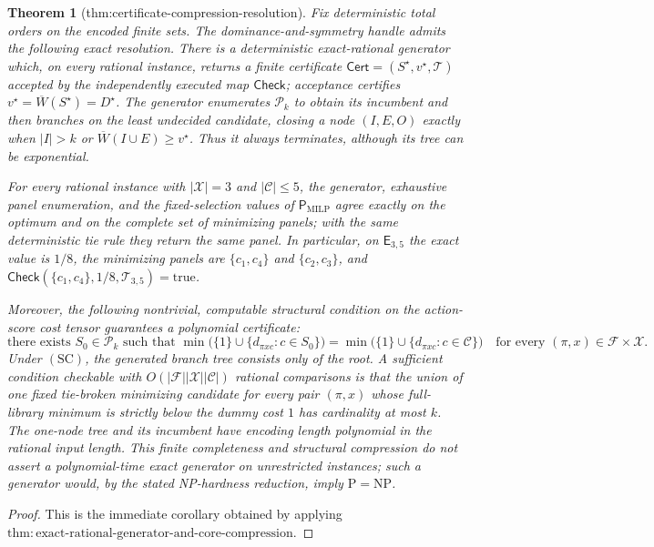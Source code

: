 \documentclass{article}
\newtheorem{theorem}{Theorem}
\begin{document}
\begin{theorem}[thm:certificate-compression-resolution]\label{thm:certificate-compression-resolution}
Fix deterministic total orders on the encoded finite sets. The dominance-and-symmetry handle admits the following exact resolution. There is a deterministic exact-rational generator which, on every rational instance, returns a finite certificate \(\mathsf{Cert}=(S^{\star},v^{\star},\mathcal T)\) accepted by the independently executed map \(\mathsf{Check}\); acceptance certifies \(v^{\star}=\overline W(S^{\star})=D^{\star}\). The generator enumerates \(\mathcal P_k\) to obtain its incumbent and then branches on the least undecided candidate, closing a node \((I,E,O)\) exactly when \(|I|>k\) or \(\overline W(I\cup E)\geq v^{\star}\). Thus it always terminates, although its tree can be exponential.

For every rational instance with \(|\mathcal X|=3\) and \(|\mathcal C|\leq5\), the generator, exhaustive panel enumeration, and the fixed-selection values of \(\mathsf P_{\mathrm{MILP}}\) agree exactly on the optimum and on the complete set of minimizing panels; with the same deterministic tie rule they return the same panel. In particular, on \(\mathsf E_{3,5}\) the exact value is \(1/8\), the minimizing panels are \(\{c_1,c_4\}\) and \(\{c_2,c_3\}\), and \(\mathsf{Check}(\{c_1,c_4\},1/8,\mathcal T_{3,5})=\mathrm{true}\).

Moreover, the following nontrivial, computable structural condition on the action-score cost tensor guarantees a polynomial certificate:
\[
 \text{there exists }S_0\in\mathcal P_k\text{ such that }
 \min\bigl(\{1\}\cup\{d_{\pi xc}:c\in S_0\}\bigr)
 =\min\bigl(\{1\}\cup\{d_{\pi xc}:c\in\mathcal C\}\bigr)
 \quad\text{for every }(\pi,x)\in\mathcal F\times\mathcal X. \tag{SC}
\]
Under \(\mathrm{(SC)}\), the generated branch tree consists only of the root. A sufficient condition checkable with \(O(|\mathcal F||\mathcal X||\mathcal C|)\) rational comparisons is that the union of one fixed tie-broken minimizing candidate for every pair \((\pi,x)\) whose full-library minimum is strictly below the dummy cost \(1\) has cardinality at most \(k\). The one-node tree and its incumbent have encoding length polynomial in the rational input length. This finite completeness and structural compression do not assert a polynomial-time exact generator on unrestricted instances; such a generator would, by the stated NP-hardness reduction, imply \(\mathrm P=\mathrm{NP}\).
\end{theorem}
\begin{proof}
This is the immediate corollary obtained by applying \(\mathrm{thm{:}exact\text{-}rational\text{-}generator\text{-}and\text{-}core\text{-}compression}\).
\end{proof}
\end{document}
